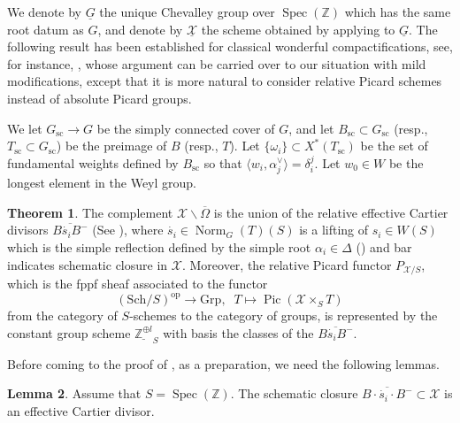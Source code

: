 \documentclass[11pt, reqno]{amsart}
\theoremstyle{plain}
\theoremstyle{definition}
\newtheorem{theorem}{Theorem}[section]
\newtheorem{lemma}[theorem]{Lemma}
\DeclareMathOperator{\Norm}{Norm}	%
\DeclareMathOperator{\Pic}{Pic}    %
\DeclareMathOperator{\Spec}{Spec}		%
\begin{document}
We denote by $\underline{G}$ the unique Chevalley group over $\Spec(\mathbb{Z})$ which has the same root datum as $G$, and denote by $\underline{\mathcal{X}}$ the scheme obtained by applying  to $\underline{G}$.
The following result has been established for classical wonderful compactifications, see, for instance, \cite[Chapter~6, Lemma~6.1.9]{BrionKumar}, whose argument can be carried over to our situation with mild modifications, except that it is more natural to consider relative Picard schemes instead of absolute Picard groups.

We let $G_{\text{sc}}\rightarrow G$ be the simply connected cover of $G$, and let $B_{\text{sc}}\subset G_{\text{sc}}$ (resp., $T_{\text{sc}}\subset G_{\text{sc}}$) be the preimage of $B$ (resp., $T$). Let $\{\omega_i\}\subset X^*(T_{\text{sc}})$ be the set of fundamental weights defined by $B_{\text{sc}}$ so that $\langle w_i, \alpha_j^\vee\rangle =\delta_i^j$. Let $w_0\in W$ be the longest element in the Weyl group.

\begin{theorem}\label{boundarydivisor}
    The complement $\mathcal{X}\backslash\overline{\Omega}$ is the union of the relative effective Cartier divisors $\overline{B\dot{s_i}B^-}$ (See \cite[062T]{stacks-project}), where $\dot{s_i}\in\Norm_G(T)(S)$ is a lifting of $s_i\in W(S)$ which is the simple reflection defined by the simple root $\alpha_i\in \Delta$ (\cite[exposé~XXII, corollaire~3.8]{SGA3III}) and bar indicates schematic closure in $\mathcal{X}$. Moreover, the relative Picard functor $P_{\mathcal{X}/S}$, which is the fppf sheaf associated to the functor
    $$ (\text{Sch}/S)^{\text{op}}\longrightarrow \text{Grp},\;\;T\longmapsto \Pic(\mathcal{X}\times_S T)$$
    from the category of $S$-schemes to the category of groups, 
    is represented by the constant group scheme $\underline{\mathbb{Z}^{\oplus l}}_S$ with basis the classes of the 
$\overline{B \dot{s_i} B^-}$.
\end{theorem}

Before coming to the proof of , as a preparation, we need the following lemmas.

\begin{lemma}
    Assume that $S=\Spec(\mathbb{Z})$. The schematic closure $\overline{B\cdot \dot{s_i} \cdot B^-}\subset \mathcal{X}$ is an effective Cartier divisor.
\end{lemma}
\end{document}
